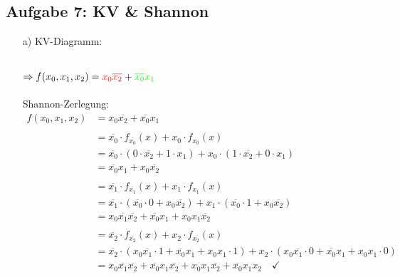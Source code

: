 \documentclass{article}
\newcommand{\nyet}{\overline}
\begin{document}
	\subsection*{Aufgabe 7: KV \& Shannon}
	\begin{enumerate}
		\item[a)]KV-Diagramm:\\
		\begin{karnaugh-map}[4][2][1][$x_2, x_0$][$x_1$]
		\end{karnaugh-map}\\
		$\Rightarrow f(x_0, x_1, x_2) = \textcolor{red}{x_0 \nyet{x_2}} + \textcolor{green}{\nyet{x_0} x_1}$ \\\\
		Shannon-Zerlegung:
		\begin{align*}
			f(x_0, x_1, x_2) &= x_0 \nyet{x_2} + \nyet{x_0} x_1 \\\\
			&= \nyet{x_0} \cdot f_{\nyet{x_0}}(x) + x_0 \cdot f_{x_0}(x) \\
			&= \nyet{x_0} \cdot (0 \cdot \nyet{x_2} + 1 \cdot x_1) + x_0 \cdot (1 \cdot \nyet{x_2} + 0 \cdot x_1) \\
			&= \nyet{x_0} x_1 + x_0 \nyet{x_2} \\\\
			&= \nyet{x_1} \cdot f_{\nyet{x_1}}(x) + x_1 \cdot f_{x_1}(x) \\
			&= \nyet{x_1} \cdot (\nyet{x_0} \cdot 0 + x_0 \nyet{x_2}) + x_1 \cdot (\nyet{x_0} \cdot 1 + x_0 \nyet{x_2}) \\
			&= x_0 \nyet{x_1} \nyet{x_2} + \nyet{x_0} x_1 + x_0 x_1 \nyet{x_2} \\\\
			&= \nyet{x_2} \cdot f_{\nyet{x_2}}(x) + x_2 \cdot f_{x_2}(x) \\
			&= \nyet{x_2} \cdot (x_0 \nyet{x_1} \cdot 1 + \nyet{x_0} x_1 + x_0 x_1 \cdot 1) + x_2 \cdot (x_0 \nyet{x_1} \cdot 0 + \nyet{x_0} x_1 + x_0 x_1 \cdot 0) \\
			&= x_0 \nyet{x_1} \nyet{x_2} + \nyet{x_0} x_1 \nyet{x_2} + x_0 x_1 \nyet{x_2} + \nyet{x_0} x_1 x_2 \quad \checkmark
		\end{align*}


\end{enumerate}
\end{document}
